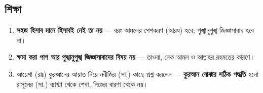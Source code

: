 \subsection*{শিক্ষা}

\begin{enumerate}
\item \textbf{সহজ হিসাব মানে হিসাবই নেই তা নয়} — বরং আমলের পেশকরণ (আরয) হবে; পুঙ্খানুপুঙ্খ জিজ্ঞাসাবাদ হবে না।
\item \textbf{ক্ষমা করা পাপ আর পুঙ্খানুপুঙ্খ জিজ্ঞাসাবাদের বিষয় নয়} — তাওবা, নেক আমল ও আল্লাহর রহমতের কারণে।
\item আয়েশা (রাঃ) কুরআনের আয়াত নিয়ে নবীজির (সা.) কাছে প্রশ্ন করলেন — \textbf{কুরআন বোঝার সঠিক পদ্ধতি} হলো রাসূলের (সা.) ব্যাখ্যা থেকে শেখা, নিজের ধারণা থেকে নয়।
\end{enumerate}


